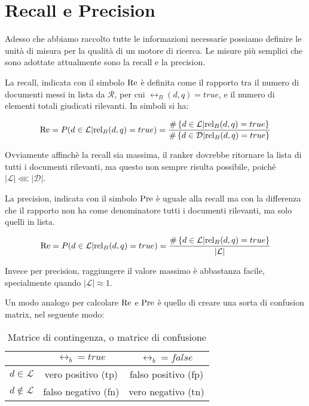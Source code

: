 \section{Recall e Precision}

Adesso che abbiamo raccolto tutte le informazioni necessarie possiamo definire
le unità di misura per la qualità di un motore di ricerca.
Le misure più semplici che sono adottate attualmente sono  la recall e la precision.

\begin{definizione}\label{def:recall}
	La recall, indicata con il simbolo $\text{Re}$ è definita come il rapporto tra il numero di documenti
	messi in lista da $\mathcal{R}$, per cui $\rel_B(d,q) = true$,
	e il numero di elementi totali giudicati rilevanti.
	In simboli si ha:
	
	$$
	\text{Re} = P(d \in \mathcal{L} | \text{rel}_B(d,q) = true) = \frac{
	\#\left\{ d \in \mathcal{L} | \text{rel}_B(d,q) = true\right\}
}{
	\#\left\{ d \in \mathcal{D} | \text{rel}_B(d,q) = true\right\}
}
	$$
\end{definizione}

Ovviamente affinchè la recall sia massima, il ranker dovrebbe ritornare la lista di tutti i documenti
rilevanti, ma questo non sempre risulta possibile, poiché $\left|\mathcal{L}\right| \lll \left|\mathcal{D}\right|$.

\begin{definizione}\label{def:precision}
	La precision, indicata con il simbolo $\text{Pre}$ è uguale alla recall
	ma con la differenza che il rapporto non ha come denominatore tutti i documenti
	rilevanti, ma solo quelli in lista.
	
	$$
	\text{Re} = P(d \in \mathcal{L} | \text{rel}_B(d,q) = true) = \frac{
		\#\left\{ d \in \mathcal{L} | \text{rel}_B(d,q) = true\right\}
	}{
	\left|\mathcal{L}\right|
	}
	$$
\end{definizione}
Invece per precision, raggiungere il valore massimo è abbastanza facile, specialmente quando $\left|\mathcal{L}\right| \approx 1$.

\pagebreak

Un modo analogo per calcolare $\text{Re}$ e $\text{Pre}$ è quello di creare una sorta di confusion
matrix, nel seguente modo:

\begin{table}[h!]
	\centering
	\begin{tabular}{|c|c|c|}
	\hline
	& $\rel_b = true$ & $\rel_b = false$ \\
	\hline
	$d \in \mathcal{L}$ &  vero positivo (tp) & falso positivo (fp) \\
	\hline
	$d \notin \mathcal{L}$ &  falso negativo (fn) & vero negativo (tn) \\
	\hline
\end{tabular}
\caption{Matrice di contingenza, o matrice di confusione}
\end{table}

